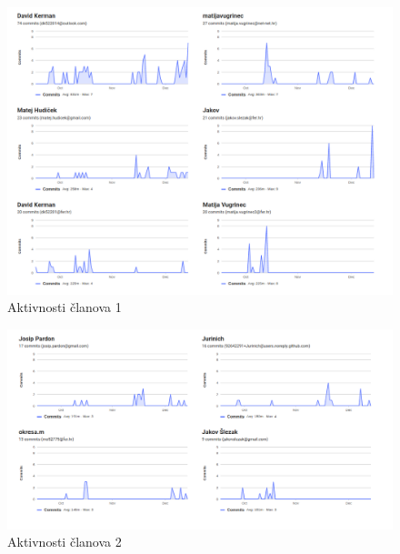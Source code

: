			
			 \begin{figure}[H]
			\centering
			\includegraphics[width=\textwidth, scale=0.5]{dijagrami/dijagram_promjena2.png}
			\caption{Aktivnosti članova 1}
			\end{figure}
			
		    \eject
			 \begin{figure}[H]
			\centering
			\includegraphics[width=\textwidth, scale=0.5]{dijagrami/dijagram_promjena3.png}
			\caption{Aktivnosti članova 2}
			\end{figure}
		
	